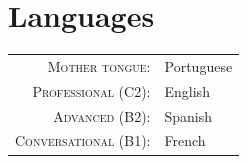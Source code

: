 \documentclass[a4paper,10pt]{article}
\begin{document}
  \begin{bibunit}
    \renewcommand\refname{Publications}

    \nocite{
      goujon_stable_2022,
      campos_learning_2022,
      aziznejad_measuring_2021,
      bohra_learning_2020,
      aziznejad_deep_2020,
      djelouah_neural_2019,
      campos_content_2019}

  \end{bibunit}

  \vspace{15pt}

  \begin{bibunit}
    \renewcommand\refname{Patents}

    \nocite{
      schroers_content_2021,
      schroers_systems_2021,
      schroers_systems_2021-1}

  \end{bibunit}

  \vspace{15pt}


  \section{Languages}

    \begin{tabular}{rp{10cm}}

      \textsc{Mother tongue:} & Portuguese \\

      \textsc{Professional (C2):} & English \\

      \textsc{Advanced (B2):} & Spanish \\

      \textsc{Conversational (B1):} & French \\

    \end{tabular}


  \vspace{15pt}
\end{document}

